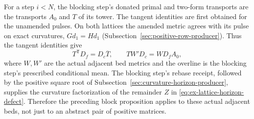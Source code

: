 For a step $i<N$, the blocking step's donated primal and two-form transports are
the transports $A_0$ and $T$ of its tower. The tangent identities are first obtained for the unamended pulses.
On both lattices the amended metric agrees with its pulse on exact
curvatures, $Gd_1=Hd_1$ (Subsection~\ref{sec:positive-row-producer}).
Thus the tangent identities give
\[
 T^{\mathsf T}D_f=D_c\overline T,
 \qquad TW'D_c=WD_fA_0,
\]
where $W,W'$ are the actual adjacent bed metrics and the overline is the
blocking step's prescribed conditional mean. The blocking step's rebase receipt, followed by the positive square root of
Subsection~\ref{sec:curvature-horizon-producer}, supplies the curvature factorization of the remainder $Z$ in
\eqref{eq:ex-lattice-horizon-defect}. Therefore the preceding block
proposition applies to these actual adjacent beds, not just to an abstract
pair of positive matrices.

